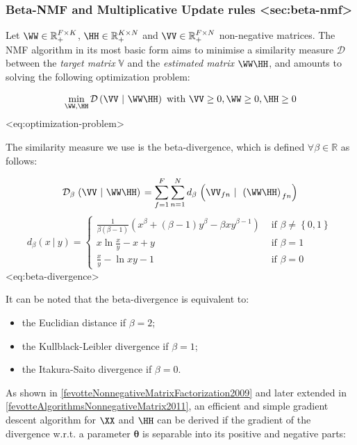 \subsubsection{Beta-NMF and Multiplicative Update rules
\textless sec:beta-nmf\textgreater{}}

Let \(\WW \in {\mathbb{R}}_{+}^{F \times K}\),
\(\HH \in {\mathbb{R}}_{+}^{K \times N}\) and
\(\VV \in {\mathbb{R}}_{+}^{F \times N}\) non-negative
matrices. The NMF algorithm in its most basic form aims to minimise a
similarity measure \(\mathcal{D}\) between the \emph{target matrix}
\(\mathbb{V}\) and the \emph{estimated matrix}
\(\WW\HH\), and amounts to solving the following
optimization problem:

\[\min\limits_{\WW,\HH}\mathcal{D}\left( \VV~|~\WW\HH \right)\text{ with }\VV \geq 0,\WW \geq 0,\HH \geq 0\]
\textless eq:optimization-problem\textgreater{}

The similarity measure we use is the beta-divergence, which is defined
\(\forall\beta \in {\mathbb{R}}\) as follows:

\[\mathcal{D}_{\beta}\left. \left( \VV~|~\WW\HH \right) \right. = \sum_{f = 1}^{F}\sum_{n = 1}^{N}d_{\beta}\left. \left( \VV_{fn}~|~\left. (\WW\HH) \right._{fn} \right) \right.\]
\[d_{\beta}\left. \left( x~|~y \right) \right. = \begin{cases}
\frac{1}{\beta\left. (\beta - 1) \right.}\left. \left( x^{\beta} + \left. (\beta - 1) \right.y^{\beta} - \beta xy^{\beta - 1} \right) \right. & \text{ if }\beta \neq \left\{ 0,1 \right\} \\
x\ln\frac{x}{y} - x + y & \text{ if }\beta = 1 \\
\frac{x}{y} - \ln xy - 1 & \text{ if }\beta = 0
\end{cases}\] \textless eq:beta-divergence\textgreater{}

It can be noted that the beta-divergence is equivalent to:

\begin{itemize}
\item
  the Euclidian distance if \(\beta = 2\);
\item
  the Kullblack-Leibler divergence if \(\beta = 1\);
\item
  the Itakura-Saito divergence if \(\beta = 0\).
\end{itemize}

As shown in
\hyperref[fevotteNonnegativeMatrixFactorization2009]{{[}fevotteNonnegativeMatrixFactorization2009{]}}
and later extended in
\hyperref[fevotteAlgorithmsNonnegativeMatrix2011]{{[}fevotteAlgorithmsNonnegativeMatrix2011{]}},
an efficient and simple gradient descent algorithm for \(\XX\)
and \(\HH\) can be derived if the gradient of the divergence
w.r.t. a parameter \(\mathbf{\theta}\) is separable into its positive
and negative parts:

